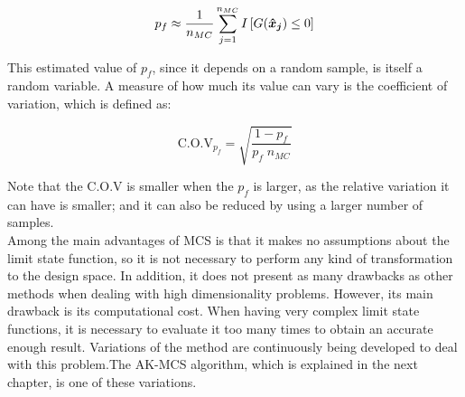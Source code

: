 \begin{equation}
    p_f \approx \frac{1}{n_{MC}} \sum_{j = 1}^{n_{MC}} I\left[ G(\bm{\hat{x}_j}) \leq 0 \right]
\end{equation}

This estimated value of $p_f$, since it depends on a random sample, is itself a random variable. A measure of how much its value can vary is the coefficient of variation, which is defined as:

\begin{equation} \label{eq:cov}
    \text{C.O.V}_{p_f} = \sqrt{\frac{1-p_f}{p_f \; n_{MC}}}
\end{equation}

Note that the C.O.V is smaller when the $p_f$ is larger, as the relative variation it can have is smaller; and it can also be reduced by using a larger number of samples. \\

Among the main advantages of MCS is that it makes no assumptions about the limit state function, so it is not necessary to perform any kind of transformation to the design space. In addition, it does not present as many drawbacks as other methods when dealing with high dimensionality problems. However, its main drawback is its computational cost. When having very complex limit state functions, it is necessary to evaluate it too many times to obtain an accurate enough result. Variations of the method are continuously being developed to deal with this problem.The AK-MCS algorithm, which is explained in the next chapter, is one of these variations.
